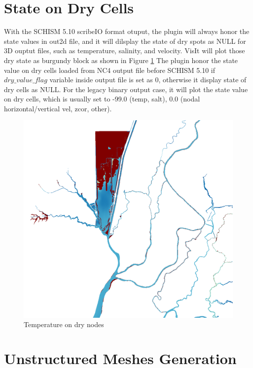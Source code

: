 \documentclass[12pt]{report}
\begin{document}
\section{State on Dry Cells}

  With the  SCHISM 5.10 scribeIO format otuput, the plugin will always honor the state values in out2d file, and it will dilsplay the state of dry spots as NULL for 3D ouptut files, such as temperature, salinity, and velocity. VisIt will plot those dry state as burgundy block as shown in  Figure \ref{figure:dryTemperature}  The plugin  honor the state value on dry cells loaded from NC4 output file before SCHISM 5.10 if $dry\_value\_flag$ variable inside output file is set as 0, otherwise  it display state of dry cells as NULL. For the legacy binary output case, it will plot the state value on dry cells, which is usually set to -99.0 (temp, salt), 0.0 (nodal horizontal/vertical vel, zcor, other).

       \begin{figure}
        \begin{center}
        \includegraphics[scale=0.4]{dry_state_temperature}
        \caption{Temperature on dry nodes}
        \label{figure:dryTemperature}
        \end{center}
        \end{figure}
	
\section{Unstructured Meshes Generation}
	
\end{document}
